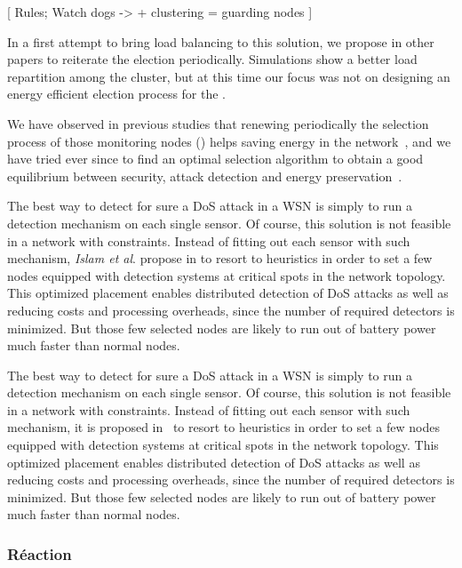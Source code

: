 [ Rules; Watch dogs -> + clustering = guarding nodes ]

In a first attempt to bring load balancing to this solution, we propose in other papers\cite{GMT12,BMM13} to reiterate the election periodically.
Simulations show a better load repartition among the cluster, but at this time our focus was not on designing an energy efficient election process for the \cns.

We have observed in previous studies that renewing periodically the selection process of those monitoring nodes (\cns) helps saving energy in the network~\cite{BMM13}, and we have tried ever since to find an optimal selection algorithm to obtain a good equilibrium between security, attack detection and energy preservation~\cite{MMB14}.


The best way to detect for sure a DoS attack in a WSN is simply to run a detection mechanism on each single sensor.
Of course, this solution is not feasible in a network with constraints.
Instead of fitting out each sensor with such mechanism, \textit{Islam et al}. propose in
\cite{INK09}
to resort to heuristics in order to set a few nodes equipped with detection systems at critical spots in the network topology.
This optimized placement enables distributed detection of DoS attacks as well as reducing costs and processing overheads, since the number of required detectors is minimized.
But those few selected nodes are likely to run out of battery power much faster than normal nodes.


The best way to detect for sure a DoS attack in a WSN is simply to run a detection mechanism on each single sensor.
Of course, this solution is not feasible in a network with constraints.
Instead of fitting out each sensor with such mechanism, it is proposed in~\cite{INK09} to resort to heuristics in order to set a few nodes equipped with detection systems at critical spots in the network topology.
This optimized placement enables distributed detection of DoS attacks as well as reducing costs and processing overheads, since the number of required detectors is minimized.
But those few selected nodes are likely to run out of battery power much faster than normal nodes.



\subsubsection{Réaction}

